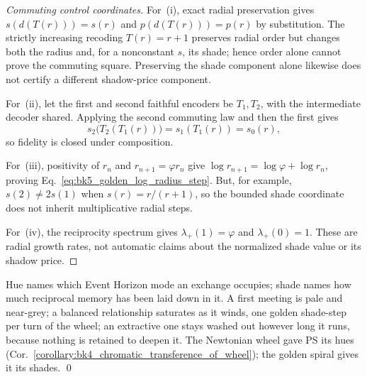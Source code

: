 \begin{proof}[Commuting control coordinates]
\label{proof:bk5_shade_transfers}
For~(i), exact radial preservation gives
$s(d(T(r)))=s(r)$ and $p(d(T(r)))=p(r)$ by substitution.  The strictly
increasing recoding $T(r)=r+1$ preserves radial order but changes both the
radius and, for a nonconstant $s$, its shade; hence order alone cannot prove
the commuting square.  Preserving the shade component alone likewise does not
certify a different shadow-price component.

For~(ii), let the first and second faithful encoders be $T_1,T_2$, with the
intermediate decoder shared.  Applying the second commuting law and then the
first gives
\[
 s_2\bigl(T_2(T_1(r))\bigr)=s_1(T_1(r))=s_0(r),
\]
so fidelity is closed under composition.

For~(iii), positivity of $r_n$ and
$r_{n+1}=\varphi r_n$ give
$\log r_{n+1}=\log\varphi+\log r_n$, proving
Eq.~\eqref{eq:bk5_golden_log_radius_step}.  But, for example,
$s(2)\neq2s(1)$ when $s(r)=r/(r+1)$, so the bounded shade coordinate does not
inherit multiplicative radial steps.

For~(iv), the reciprocity spectrum gives
$\lambda_+(1)=\varphi$ and $\lambda_+(0)=1$.  These are radial growth rates,
not automatic claims about the normalized shade value or its shadow price.
\end{proof}

\begin{scholium}
\label{scholium:bk5_palette_of_a_relation}
Hue names which Event Horizon mode an exchange occupies; shade names how much
reciprocal memory has been laid down in it. A first meeting is pale and near-grey; a
balanced relationship saturates as it winds, one golden shade-step per turn of the
wheel; an extractive one stays washed out however long it runs, because nothing is
retained to deepen it. The Newtonian wheel gave PS its hues
(Cor.~\ref{corollary:bk4_chromatic_transference_of_wheel}); the golden spiral gives it
its shades. \qed
\end{scholium}

